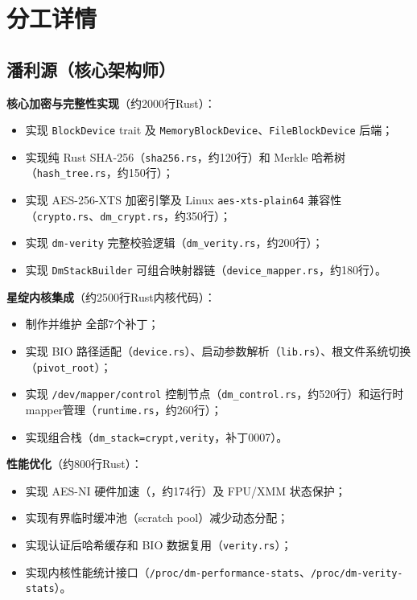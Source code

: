 \section{分工详情}

\subsection{潘利源（核心架构师）}

\textbf{核心加密与完整性实现}（约2000行Rust）：
\begin{itemize}
    \item 实现 \texttt{BlockDevice} trait 及 \texttt{MemoryBlockDevice}、\texttt{FileBlockDevice} 后端；
    \item 实现纯 Rust SHA-256（\texttt{sha256.rs}，约120行）和 Merkle 哈希树（\texttt{hash\_tree.rs}，约150行）；
    \item 实现 AES-256-XTS 加密引擎及 Linux \texttt{aes-xts-plain64} 兼容性（\texttt{crypto.rs}、\texttt{dm\_crypt.rs}，约350行）；
    \item 实现 \texttt{dm-verity} 完整校验逻辑（\texttt{dm\_verity.rs}，约200行）；
    \item 实现 \texttt{DmStackBuilder} 可组合映射器链（\texttt{device\_mapper.rs}，约180行）。
\end{itemize}

\textbf{星绽内核集成}（约2500行Rust内核代码）：
\begin{itemize}
    \item 制作并维护 \texttt{} 全部7个补丁；
    \item 实现 BIO 路径适配（\texttt{device.rs}）、启动参数解析（\texttt{lib.rs}）、根文件系统切换（\texttt{pivot\_root}）；
    \item 实现 \texttt{/dev/mapper/control} 控制节点（\texttt{dm\_control.rs}，约520行）和运行时mapper管理（\texttt{runtime.rs}，约260行）；
    \item 实现组合栈（\texttt{dm\_stack=crypt,verity}，补丁0007）。
\end{itemize}

\textbf{性能优化}（约800行Rust）：
\begin{itemize}
    \item 实现 AES-NI 硬件加速（\texttt{}，约174行）及 FPU/XMM 状态保护；
    \item 实现有界临时缓冲池（scratch pool）减少动态分配；
    \item 实现认证后哈希缓存和 BIO 数据复用（\texttt{verity.rs}）；
    \item 实现内核性能统计接口（\texttt{/proc/dm-performance-stats}、\texttt{/proc/dm-verity-stats}）。
\end{itemize}

